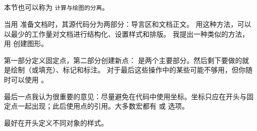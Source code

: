 \subsection{}
本节也可以称为 \texttt{计算与绘图的分离}。

当用 \LATEX 准备文档时，其源代码分为两部分：导言区和文档正文。
用这种方法，可以以最少的工作量对文档进行结构化、设置样式和排版。
我提出一种类似的方法，用 \tkzname{\tkznameofpack} 创建图形。

第一部分定义固定点，第二部分创建新点： 是两个主要部分。然后剩下要做的就是绘制（或填充）、标记和标注。\tkzname{\tkznameofpack} 对于最后这些操作中的某些可能不够用，但你随时可以使用 \TIKZ。

最后一点我认为很重要的意见：尽量避免在代码中使用坐标。坐标只应在开头与固定点一起出现；此后使用点的引用。大多数宏都有  或  选项。

最好在开头定义不同对象的样式。
\endinput
